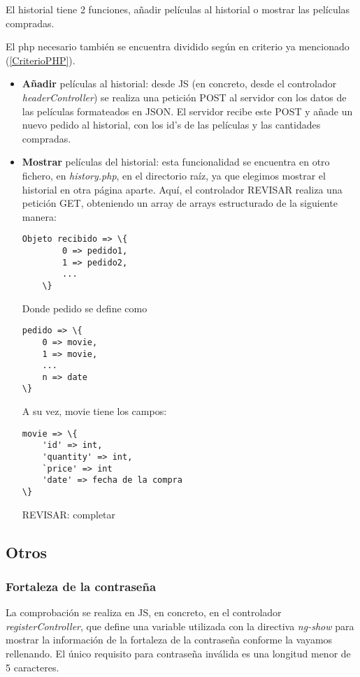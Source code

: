 \documentclass{apuntes}
\begin{document}
El historial tiene 2 funciones, añadir películas al historial o mostrar las películas compradas. 

El php necesario también se encuentra dividido según en criterio ya mencionado (\ref{CriterioPHP}).

\begin{itemize}
\item \textbf{Añadir} películas al historial: desde JS (en concreto, desde el controlador \textit{headerController}) se realiza una petición POST al servidor con los datos de las películas formateados en JSON. El servidor recibe este POST y añade un nuevo pedido al historial, con los id's de las películas y las cantidades compradas. 

\item \textbf{Mostrar} películas del historial: esta funcionalidad se encuentra en otro fichero, en \textit{history.php}, en el directorio raíz, ya que elegimos mostrar el historial en otra página aparte. Aquí, el controlador REVISAR realiza una petición GET, obteniendo un array de arrays estructurado de la siguiente manera:

\begin{verbatim}
Objeto recibido => \{
		0 => pedido1,
		1 => pedido2,
		...
	\}
\end{verbatim}
Donde pedido se define como 

\begin{verbatim}pedido => \{
	0 => movie,
	1 => movie,
	...
	n => date
\}
\end{verbatim}

A su vez, movie tiene los campos:

\begin{verbatim}
movie => \{
	'id' => int,
	'quantity' => int,
	`price' => int
	'date' => fecha de la compra
\}
\end{verbatim}

REVISAR: completar

\end{itemize}

\subsection{Otros}

\subsubsection{Fortaleza de la contraseña}
\label{PasStrength}

La comprobación se realiza en JS, en concreto, en el controlador \textit{registerController}, que define una variable utilizada con la directiva \textit{ng-show} para mostrar la información de la fortaleza de la contraseña conforme la vayamos rellenando. El único requisito para contraseña inválida es una longitud menor de 5 caracteres.
\end{document}

